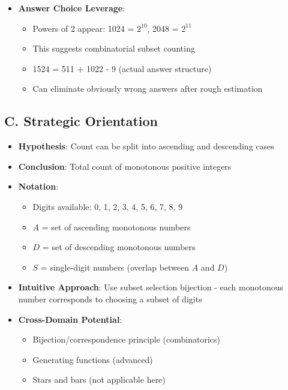 \documentclass[]{article}
\begin{document}
\begin{problemconfigbox}
\begin{itemize}[leftmargin=*]
    \item \textbf{Answer Choice Leverage}: 
    \begin{itemize}
        \item Powers of 2 appear: 1024 = $2^{10}$, 2048 = $2^{11}$
        \item This suggests combinatorial subset counting
        \item 1524 = 511 + 1022 - 9 (actual answer structure)
        \item Can eliminate obviously wrong answers after rough estimation
    \end{itemize}
\end{itemize}

\subsection*{C. Strategic Orientation}
\begin{itemize}[leftmargin=*]
    \item \textbf{Hypothesis}: Count can be split into ascending and descending cases
    \item \textbf{Conclusion}: Total count of monotonous positive integers
    \item \textbf{Notation}: 
    \begin{itemize}
        \item Digits available: 0, 1, 2, 3, 4, 5, 6, 7, 8, 9
        \item $A$ = set of ascending monotonous numbers
        \item $D$ = set of descending monotonous numbers
        \item $S$ = single-digit numbers (overlap between $A$ and $D$)
    \end{itemize}
    
    \item \textbf{Intuitive Approach}: Use subset selection bijection - each monotonous number corresponds to choosing a subset of digits
    
    \item \textbf{Cross-Domain Potential}: 
    \begin{itemize}
        \item Bijection/correspondence principle (combinatorics)
        \item Generating functions (advanced)
        \item Stars and bars (not applicable here)
    \end{itemize}
\end{itemize}
\end{problemconfigbox}
\end{document}
